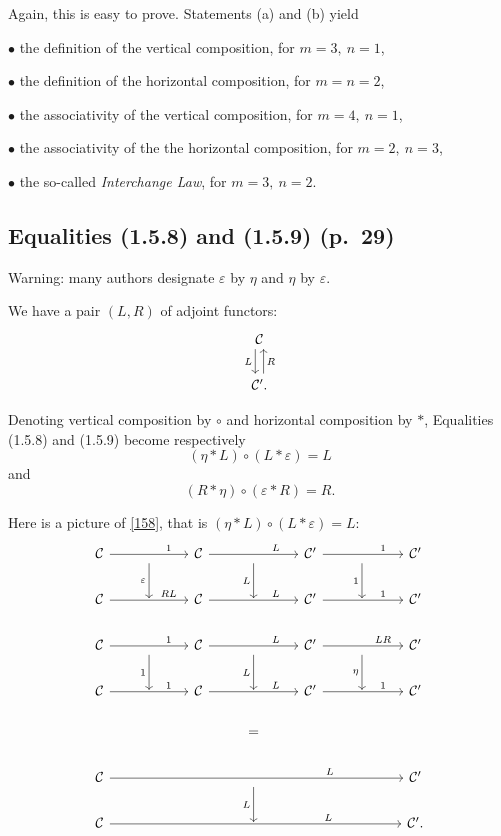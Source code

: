 \documentclass[12pt]{article}
\theoremstyle{remark}
\theoremstyle{definition}
\newcommand{\bu}{\bullet}
\newcommand{\C}{\mathcal C}
\begin{document}
Again, this is easy to prove. Statements (a) and (b) yield 

\noindent$\bu$ the definition of the vertical composition, for $m=3,\ n=1$,

\noindent$\bu$ the definition of the horizontal composition, for $m=n=2$,

\noindent$\bu$ the associativity of the vertical composition, for $m=4,\ n=1$,

\noindent$\bu$ the associativity of the the horizontal composition, for $m=2,\ n=3$,

\noindent$\bu$ the so-called \emph{Interchange Law}, for $m=3,\ n=2$.
%
\subsection{Equalities (1.5.8) and (1.5.9) (p.~29)}
%
Warning: many authors designate $\varepsilon$ by $\eta$ and $\eta$ by $\varepsilon$. 

We have a pair $(L,R)$ of adjoint functors: 
$$
\begin{tikzcd}
\C\ar[xshift=-.7ex]{d}[swap]{L}\\ 
\C'.\ar[xshift=.7ex]{u}[swap]{R}
\end{tikzcd}
$$

Denoting vertical composition by $\circ$ and horizontal composition by $*$, Equalities (1.5.8) and (1.5.9) become respectively 
%
\begin{equation}\label{158}
(\eta*L)\circ(L*\varepsilon)=L
\end{equation}
%
and 
%
\begin{equation}\label{159}
(R*\eta)\circ(\varepsilon*R)=R.
\end{equation}
%

Here is a picture of \eqref{158}, that is $(\eta*L)\circ(L*\varepsilon)=L$: 
$$
\begin{tikzcd}
%
\C\ar{rr}{}[near end]{1}&\ar{d}[swap]{\varepsilon}&\C\ar{rr}{}[near end]{L}&\ar{d}[swap]{L}&\C'\ar{rr}{}[near end]{1}&\ar{d}[swap]{1}&\C'\\ 
%
\C\ar{rr}{}[near end]{RL}&{}&\C\ar{rr}{}[near end]{L}&{}&\C'\ar{rr}{}[near end]{1}&{}&\C'\\ 
%
\C\ar{rr}{}[near end]{1}&\ar{d}[swap]{1}&\C\ar{rr}{}[near end]{L}&\ar{d}[swap]{L}&\C'\ar{rr}{}[near end]{LR}&\ar{d}[swap]{\eta}&\C'\\ 
%
\C\ar{rr}{}[near end]{1}&{}&\C\ar{rr}{}[near end]{L}&{}&\C'\ar{rr}{}[near end]{1}&{}&\C'\\ 
%
&&&=\\ 
%
\C\ar{rrrrrr}[near end]{L}&&&{}\ar{d}[swap]{L}&&&\C'\\
%
\C\ar{rrrrrr}[near end]{L}&&&{}&&&\C'.
%
\end{tikzcd}
$$ 
\end{document}
